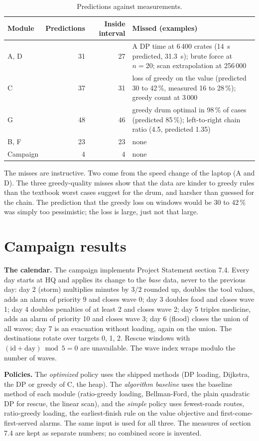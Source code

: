 \documentclass[11pt,a4paper]{article}
\begin{document}
\begin{table}[t]
\centering\small
\caption{Predictions against measurements.}\label{tab:pred}
\begin{tabularx}{\textwidth}{@{}lrrX@{}}
\toprule
Module & Predictions & Inside interval & Missed (examples)\\
\midrule
A, D & 31 & 27 & A DP time at 6\,400 crates (14~s predicted, 31.3~s); brute force at $n=20$; scan extrapolation at 256\,000\\
C & 37 & 31 & loss of greedy on the value (predicted 30 to 42\,\%, measured 16 to 28\,\%); greedy count at 3\,000\\
G & 48 & 46 & greedy drum optimal in 98\,\% of cases (predicted 85\,\%); left-to-right chain ratio (4.5, predicted 1.35)\\
B, F & 23 & 23 & none\\
Campaign & 4 & 4 & none\\
\bottomrule
\end{tabularx}
\end{table}

The misses are instructive. Two come from the speed change of the laptop (A and D). The three greedy-quality misses show that the data are kinder to greedy rules than the textbook worst cases suggest for the drum, and harsher than guessed for the chain.
The prediction that the greedy loss on windows would be 30 to 42\,\% was simply too pessimistic; the loss is large, just not that large.

\section{Campaign results}\label{sec:camp}
\textbf{The calendar.} The campaign implements Project Statement section 7.4. Every day starts at HQ and applies its change to the \emph{base} data, never to the previous day: day 2 (storm) multiplies minutes by $3/2$ rounded up, doubles the tool values, adds an alarm of priority 9 and closes wave 0; day 3 doubles food and closes wave 1;
day 4 doubles penalties of at least 2 and closes wave 2; day 5 triples medicine, adds an alarm of priority 10 and closes wave 3; day 6 (flood) closes the union of all waves; day 7 is an evacuation without loading, again on the union.
The destinations rotate over targets 0, 1, 2. Rescue windows with $(\text{id}+\text{day})\bmod5=0$ are unavailable. The wave index wraps modulo the number of waves.

\textbf{Policies.} The \emph{optimized} policy uses the shipped methods (DP loading, Dijkstra, the DP or greedy of C, the heap). The \emph{algorithm baseline} uses the baseline method of each module (ratio-greedy loading, Bellman-Ford, the plain quadratic DP for rescue, the linear scan), and the \emph{simple} policy uses
fewest-roads routes, ratio-greedy loading, the earliest-finish rule on the value objective and first-come-first-served alarms. The same input is used for all three. The measures of section 7.4 are kept as separate numbers; no combined score is invented.
\end{document}
